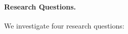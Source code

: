 \documentclass[11pt]{article}
\begin{document}






\paragraph{Research Questions.}
We investigate four research questions:
\end{document}
